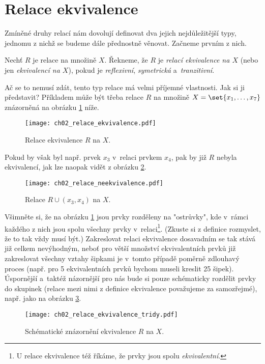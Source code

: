 \section{Relace ekvivalence}\label{sec:relace_ekvivalence}
Zmíněné druhy relací nám dovolují definovat dva jejich nejdůležitější typy, jednomu z nichž se budeme dále přednostně věnovat. Začneme prvním z nich.
\begin{definition}\label{def:relace_ekvivalence}
    Nechť $R$ je relace na množině $X$. Řekneme, že $R$ je \emph{relací ekvivalence na $X$} (nebo jen \emph{ekvivalencí na $X$}), pokud je \emph{reflexivní}, \emph{symetrická} a~\emph{tranzitivní}.
\end{definition}
Ač se to nemusí zdát, tento typ relace má velmi příjemné vlastnosti. Jak si ji představit? Příkladem může být třeba relace $R$ na množině $X=\set{x_1,\dots,x_7}$ znázorněná na obrázku \ref{fig:priklad_relace_ekvivalence} níže.
\begin{figure}[H]
    \centering
    \texttt{[image: ch02\_relace\_ekvivalence.pdf]}
    \caption{Relace ekvivalence $R$ na $X$.}
    \label{fig:priklad_relace_ekvivalence}
\end{figure}
Pokud by však byl např. prvek $x_3$ v~relaci prvkem $x_4$, pak by již $R$ nebyla ekvivalencí, jak lze naopak vidět z obrázku \ref{fig:priklad_relace_neekvivalence}.
\begin{figure}[H]
    \centering
    \texttt{[image: ch02\_relace\_neekvivalence.pdf]}
    \caption{Relace $R \cup (x_3,x_4)$ na $X$.}
    \label{fig:priklad_relace_neekvivalence}
\end{figure}
Všimněte si, že na obrázku \ref{fig:priklad_relace_ekvivalence} jsou prvky rozděleny na "ostrůvky", kde v~rámci každého z nich jsou spolu všechny prvky v~relaci\footnote{U relace ekvivalence též říkáme, že prvky jsou spolu \emph{ekvivalentní}.}. (Zkuste si z definice rozmyslet, že to tak vždy musí být.) Zakreslovat relaci ekvivalence dosavadním se tak stává již celkem nevýhodným, neboť pro větší množství ekvivalentních prvků již zakreslovat všechny vztahy šipkami je v~tomto případě poměrně zdlouhavý proces (např. pro 5 ekvivalentních prvků bychom museli kreslit 25 šipek). Úspornější a~taktéž názornější pro nás bude si pouze schématicky rozdělit prvky do skupinek (relace mezi nimi z definice ekvivalence považujeme za samozřejmé), např. jako na obrázku \ref{fig:relace_ekvivalence_tridy}.
\begin{figure}[H]
    \centering
    \texttt{[image: ch02\_relace\_ekvivalence\_tridy.pdf]}
    \caption{Schématické znázornění ekvivalence $R$ na $X$.}
    \label{fig:relace_ekvivalence_tridy}
\end{figure}
